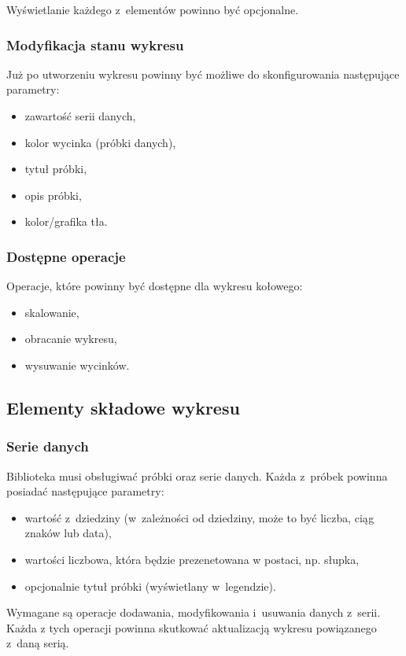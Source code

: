 \documentclass[11pt,twoside,a4paper,final]{article}
\begin{document}
Wyświetlanie każdego z~elementów powinno być opcjonalne. 

\subsubsection{Modyfikacja stanu wykresu}
Już po utworzeniu wykresu powinny być możliwe do skonfigurowania następujące parametry:
\begin{itemize}
\item{zawartość serii danych,}
\item{kolor wycinka (próbki danych),}
\item{tytuł próbki,}
\item{opis próbki,}
\item{kolor/grafika tła.}
\end{itemize}

\subsubsection{Dostępne operacje}
Operacje, które powinny być dostępne dla wykresu kołowego:
\begin{itemize}
\item{skalowanie,}
\item{obracanie wykresu,}
\item{wysuwanie wycinków.}
\end{itemize}

\subsection{Elementy składowe wykresu}
\subsubsection{Serie danych}
Biblioteka musi obsługiwać próbki oraz serie danych. Każda z~próbek powinna posiadać następujące parametry:
\begin{itemize}
\item{wartość z~dziedziny (w~zależności od dziedziny, może to być liczba, ciąg znaków lub data),}
\item{wartości liczbowa, która będzie prezenetowana w postaci, np. słupka,}
\item{opcjonalnie tytuł próbki (wyświetlany w~legendzie).}
\end{itemize}

Wymagane są operacje dodawania, modyfikowania i~usuwania danych z~serii. Każda z tych operacji powinna skutkować aktualizacją wykresu powiązanego z~daną serią.
  
\end{document}
